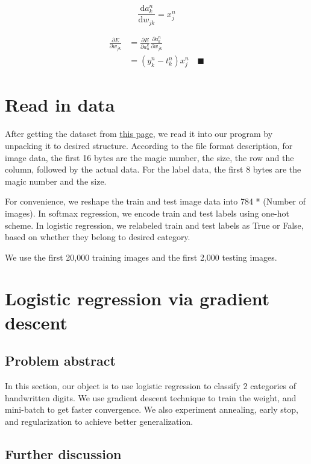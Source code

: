 \documentclass{article}
\begin{document}
\begin{equation*}
	\dfrac{\mathrm{d} a_k^n}{\mathrm{d} w_{jk}} = x_j^n
\end{equation*}

\begin{equation*}
\begin{split}
	\frac{\partial E}{\partial w_{jk}} &= \frac{\partial E}{\partial a_n^k} \frac{\partial a_k^n}{\partial w_{jk}} \\
	&= (y_k^n - t_k^n) x_j^n \quad\blacksquare
\end{split}
\end{equation*}

\section{Read in data}
After getting the dataset from \href{http://yann.lecun.com/exdb/mnist/}{this page}, we read it into our program by unpacking it to desired structure. According to the file format description, for image data, the first 16 bytes are the magic number, the size, the row and the column, followed by the actual data. For the label data, the first 8 bytes are the magic number and the size.

For convenience, we reshape the train and test image data into 784 * (Number of images). In softmax regression, we encode train and test labels using one-hot scheme. In logistic regression, we relabeled train and test labels as True or False, based on whether they belong to desired category.

We use the first 20,000 training images and the first 2,000 testing images.

\section{Logistic regression via gradient descent}
\subsection{Problem abstract}
In this section, our object is to use logistic regression to classify 2 categories of handwritten digits. We use gradient descent technique to train the weight, and mini-batch to get faster convergence. We also experiment annealing, early stop, and regularization to achieve better generalization.

\subsection{Further discussion}
\end{document}
